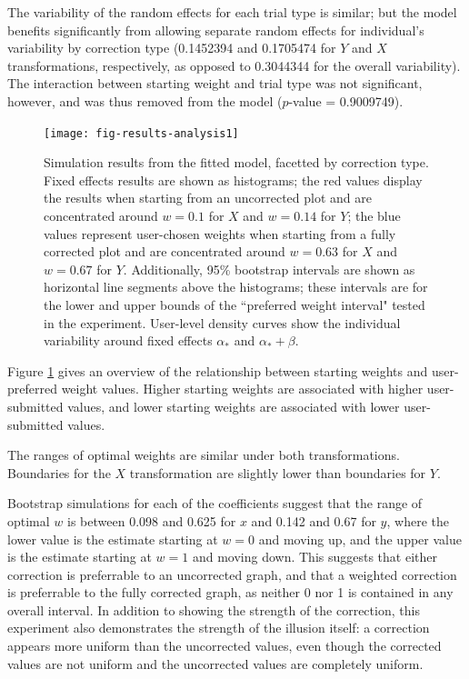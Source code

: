 \documentclass[11pt]{isuthesis}\usepackage[]{graphicx}\usepackage[]{color}
\begin{document}
The variability of the random effects for each trial type is similar; but the model benefits significantly from allowing separate random effects for individual's variability by correction type (0.1452394 and 0.1705474 for $Y$ and $X$ transformations, respectively, as opposed to 0.3044344 for the overall variability). The interaction between starting weight and trial type was not significant, however, and was thus removed from the model ($p$-value = 0.9009749).

\begin{figure}[hbtp]
\centering
\texttt{[image: fig-results-analysis1]}
\caption[Results from mixed model]{Simulation results from the fitted model, facetted by correction type. Fixed effects results are shown as histograms; the red values display the results when starting from an uncorrected plot and are concentrated around $w=0.1$ for $X$ and $w=0.14$ for $Y$; the blue values represent user-chosen weights when starting from a fully corrected plot and are concentrated around $w=0.63$ for $X$ and $w=0.67$ for $Y$. Additionally, 95\% bootstrap intervals are shown as horizontal line segments above the histograms; these intervals are for the lower and upper bounds of the ``preferred weight interval" tested in the experiment. User-level density curves show the individual variability around  fixed effects $\alpha_*$ and $\alpha_*+\beta$.}\label{fig:MixedModelResults}
\end{figure}
Figure \ref{fig:MixedModelResults} gives an overview of the relationship between starting weights and  user-preferred weight values. Higher starting weights are associated with higher user-submitted values, and lower starting weights are associated with lower user-submitted values.

The ranges of optimal weights are similar under both transformations. Boundaries for the $X$ transformation are slightly lower than boundaries for $Y$. 

Bootstrap simulations for each of the coefficients suggest that the range of optimal $w$ is between 0.098 and 0.625 for $x$ and 0.142 and 0.67 for $y$, where the lower value is the estimate starting at $w=0$ and moving up, and the upper value is the estimate starting at $w=1$ and moving down. This suggests that either correction is preferrable to an uncorrected graph, and that a weighted correction is preferrable to the fully corrected graph, as neither 0 nor 1 is contained in any overall interval. In addition to showing the strength of the correction, this experiment also demonstrates the strength of the illusion itself: a correction appears more uniform than the uncorrected values, even though the corrected values are not uniform and the uncorrected values are completely uniform. 
\end{document}

